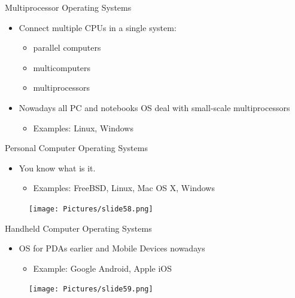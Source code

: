 \documentclass{beamer}
\begin{document}
\begin{frame}
{\centerline{Multiprocessor Operating Systems}}
\begin{itemize}
    \item Connect multiple CPUs in a single system:
    \begin{itemize}
        \item parallel computers
        \item multicomputers
        \item multiprocessors
    \end{itemize}
    \item Nowadays all PC and notebooks OS deal with small-scale multiprocessors
    \begin{itemize}
        \item Examples: Linux, Windows
    \end{itemize}
\end{itemize}
\end{frame}


\begin{frame}
{\centerline{Personal Computer Operating Systems}}
\begin{itemize}
    \item You know what is it.
    \begin{itemize}
        \item Examples: FreeBSD, Linux, Mac OS X, Windows
    \end{itemize}
\end{itemize}
\begin{figure}
    \centering
    \texttt{[image: Pictures/slide58.png]}
\end{figure}
\end{frame}


\begin{frame}
{\centerline{Handheld Computer Operating Systems}}
\begin{itemize}
    \item OS for PDAs earlier and Mobile Devices nowadays
    \begin{itemize}
        \item Example: Google Android, Apple iOS
    \end{itemize}
\end{itemize}
\begin{figure}
    \centering
    \texttt{[image: Pictures/slide59.png]}
\end{figure}
\end{frame}
\end{document}
